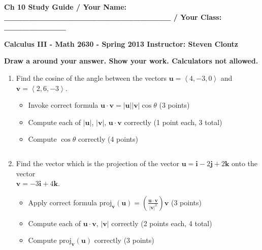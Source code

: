\documentclass[12pt]{article}
\newcommand{\up}{$~$\vspace*{-0.7in}}
\newcommand{\liner}{\noindent\underline{\hspace*{7in}}}
\newcommand{\spac}{\hspace*{3em}}
\newcommand{\ds}{\displaystyle}
\renewcommand{\vec}{\mathbf}
\newcommand{\veci}{\vec{i}}
\newcommand{\vecj}{\vec{j}}
\newcommand{\veck}{\vec{k}}
\newcommand{\proj}{\mbox{proj}}
\newcommand{\<}{\left<}
\renewcommand{\>}{\right>}
\begin{document}
\up

{ \bf Ch 10 Study Guide / Your Name: \_\_\_\_\_\_\_\_\_\_\_\_\_\_\_\_\_\_\_\_\_\_\_\_\_\_\_ / Your Class: \_\_\_\_\_\_\_\_\_\_}

\vspace*{0.2in}

\centerline{ \bf Calculus III - Math 2630 - Spring 2013 \spac Instructor: Steven Clontz}

\vspace*{0.2in}

{\bf Draw a  around your answer. Show your work. Calculators not allowed.}

\indent\liner


\begin{enumerate}

\item Find the cosine of the angle between the vectors $\vec{u}=\<4,-3,0\>$ and $\vec{v}=\<2,6,-3\>$.

  \begin{itemize}
\item Invoke correct formula $\vec{u}\cdot\vec{v} = |\vec{u}||\vec{v}|\cos \theta$ (3 points)
\item Compute each of $|\vec{u}|$, $|\vec{v}|$, $\vec{u}\cdot\vec{v}$ correctly (1 point each, 3 total)
\item Compute $\cos \theta$ correctly (4 points)
  \end{itemize}

\vspace*{6.5in}

\liner
\newpage\up

\item Find the vector which is the projection of the vector $\vec{u} = \veci-2\vecj+2\veck$ onto the vector \\$\vec{v}=-3\veci+4\veck$.

\begin{itemize}
\item Apply correct formula $\ds\proj_{\vec{v}}(\vec{u}) = \left(\frac{\vec{u}\cdot\vec{v}}{|\vec{v}|^2}\right)\vec{v}$ (3 points)
\item Compute each of $\vec{u}\cdot\vec{v}$, $|\vec{v}|$ correctly (2 points each, 4 total)
\item Compute $\proj_{\vec{v}}(\vec{u})$ correctly (3 points)
\end{itemize}

\vspace*{7in}


\end{enumerate}
\end{document}
